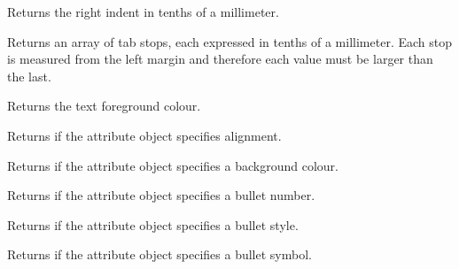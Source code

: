 
Returns the right indent in tenths of a millimeter.

\label{wxrichtextattrgettabs}


Returns an array of tab stops, each expressed in tenths of a millimeter. Each stop
is measured from the left margin and therefore each value must be larger than the last.

\label{wxrichtextattrgettextcolour}


Returns the text foreground colour.

\label{wxrichtextattrhasalignment}


Returns \true if the attribute object specifies alignment.

\label{wxrichtextattrhasbackgroundcolour}


Returns \true if the attribute object specifies a background colour.

\label{wxrichtextattrhasbulletnumber}


Returns \true if the attribute object specifies a bullet number.

\label{wxrichtextattrhasbulletstyle}


Returns \true if the attribute object specifies a bullet style.

\label{wxrichtextattrhasbulletsymbol}


Returns \true if the attribute object specifies a bullet symbol.

\label{wxrichtextattrhascharacterstylename}


